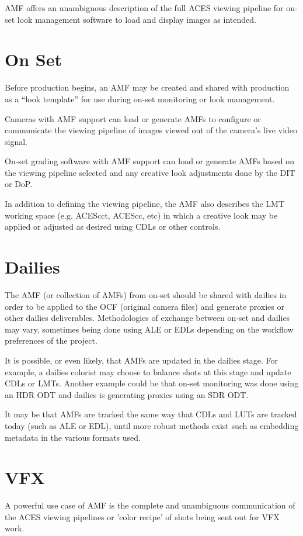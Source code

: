 AMF offers an unambiguous description of the full ACES viewing pipeline for on-set look management software to load and display images as intended.

\section{On Set}
Before production begins, an AMF may be created and shared with production as a ``look template'' for use during on-set monitoring or look management.

Cameras with AMF support can load or generate AMFs to configure or communicate the viewing pipeline of images viewed out of the camera's live video signal.

On-set grading software with AMF support can load or generate AMFs based on the viewing pipeline selected and any creative look adjustments done by the DIT or DoP.

In addition to defining the viewing pipeline, the AMF also describes the LMT working space (e.g. ACEScct, ACEScc, etc) in which a creative look may be applied or adjusted as desired using CDLs or other controls.

\section{Dailies}
The AMF (or collection of AMFs) from on-set should be shared with dailies in order to be applied to the OCF (original camera files) and generate proxies or other dailies deliverables. Methodologies of exchange between on-set and dailies may vary, sometimes being done using ALE or EDLs depending on the workflow preferences of the project.

It is possible, or even likely, that AMFs are updated in the dailies stage. For example, a dailies colorist may choose to balance shots at this stage and update CDLs or LMTs. Another example could be that on-set monitoring was done using an HDR ODT and dailies is generating proxies using an SDR ODT.

It may be that AMFs are tracked the same way that CDLs and LUTs are tracked today (such as ALE or EDL), until more robust methods exist such as embedding metadata in the various formats used.

\section{VFX}
A powerful use case of AMF is the complete and unambiguous communication of the ACES viewing pipelines or 'color recipe' of shots being sent out for VFX work. 

